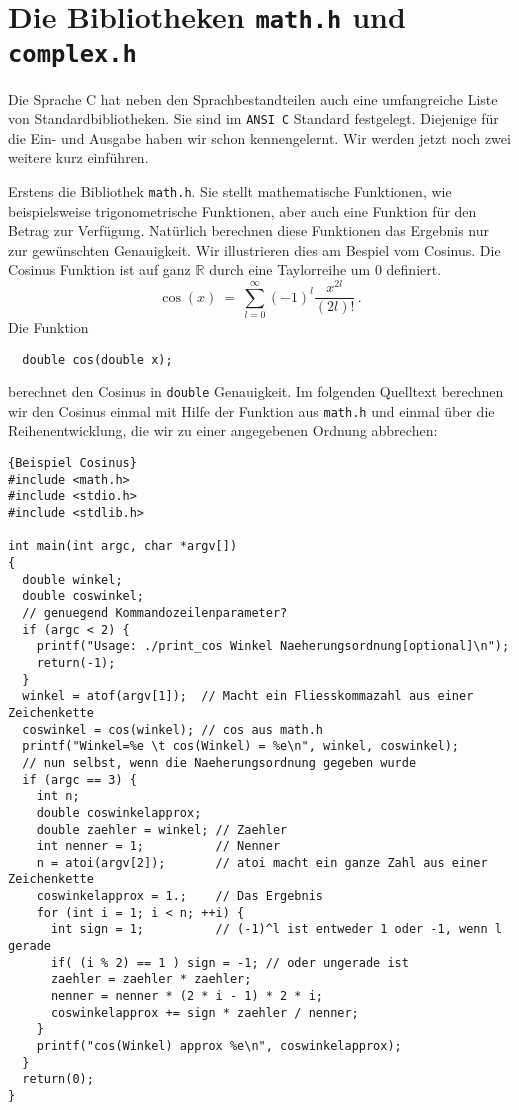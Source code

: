 \section{Die Bibliotheken \texttt{math.h} und \texttt{complex.h}}

Die Sprache C hat neben den Sprachbestandteilen auch eine umfangreiche Liste von Standardbibliotheken.
Sie sind im \texttt{ANSI C} Standard festgelegt.
Diejenige für die Ein- und Ausgabe haben wir schon kennengelernt.
Wir werden jetzt noch zwei weitere kurz einführen.

Erstens die Bibliothek \texttt{math.h}.
Sie stellt mathematische Funktionen, wie beispielsweise trigonometrische Funktionen, aber auch eine Funktion für den Betrag zur Verfügung.
Natürlich berechnen diese Funktionen das Ergebnis nur zur gewünschten Genauigkeit.
Wir illustrieren dies am Bespiel vom Cosinus.
Die Cosinus Funktion ist auf ganz $\mathbb{R}$ durch eine Taylorreihe um 0 definiert.
\begin{equation}
  \cos\left(x\right)\ =\ \sum_{l=0}^{\infty} \left(-1\right)^{l} \dfrac{x^{2l}}{\left(2l\right)!}\,.
\end{equation}
Die Funktion 
\begin{lstlisting}
  double cos(double x);
\end{lstlisting}
berechnet den Cosinus in \texttt{double} Genauigkeit.
Im folgenden Quelltext berechnen wir den Cosinus einmal mit Hilfe der Funktion aus \texttt{math.h} und einmal über die Reihenentwicklung, die wir zu einer angegebenen Ordnung abbrechen:
\begin{lstlisting}{Beispiel Cosinus}
#include <math.h>
#include <stdio.h>
#include <stdlib.h>

int main(int argc, char *argv[])
{
  double winkel;
  double coswinkel;
  // genuegend Kommandozeilenparameter?
  if (argc < 2) {
    printf("Usage: ./print_cos Winkel Naeherungsordnung[optional]\n");
    return(-1);
  }
  winkel = atof(argv[1]);  // Macht ein Fliesskommazahl aus einer Zeichenkette
  coswinkel = cos(winkel); // cos aus math.h
  printf("Winkel=%e \t cos(Winkel) = %e\n", winkel, coswinkel);
  // nun selbst, wenn die Naeherungsordnung gegeben wurde
  if (argc == 3) {
    int n;
    double coswinkelapprox;
    double zaehler = winkel; // Zaehler
    int nenner = 1;          // Nenner
    n = atoi(argv[2]);       // atoi macht ein ganze Zahl aus einer Zeichenkette
    coswinkelapprox = 1.;    // Das Ergebnis
    for (int i = 1; i < n; ++i) {
      int sign = 1;          // (-1)^l ist entweder 1 oder -1, wenn l gerade
      if( (i % 2) == 1 ) sign = -1; // oder ungerade ist
      zaehler = zaehler * zaehler;
      nenner = nenner * (2 * i - 1) * 2 * i;
      coswinkelapprox += sign * zaehler / nenner;
    }
    printf("cos(Winkel) approx %e\n", coswinkelapprox);
  }
  return(0);
}
\end{lstlisting}
